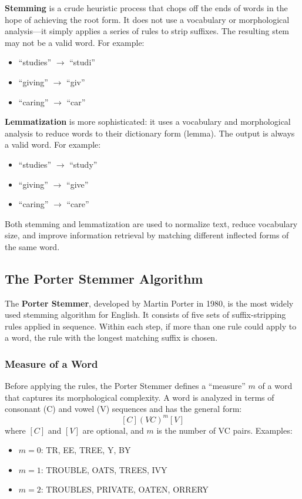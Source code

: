 \documentclass[11pt,a4paper]{article}
\begin{document}
\textbf{Stemming} is a crude heuristic process that chops off the ends of words in the hope of achieving the root form. It does not use a vocabulary or morphological analysis---it simply applies a series of rules to strip suffixes. The resulting stem may not be a valid word. For example:
\begin{itemize}
    \item ``studies'' $\to$ ``studi''
    \item ``giving'' $\to$ ``giv''
    \item ``caring'' $\to$ ``car''
\end{itemize}

\textbf{Lemmatization} is more sophisticated: it uses a vocabulary and morphological analysis to reduce words to their dictionary form (lemma). The output is always a valid word. For example:
\begin{itemize}
    \item ``studies'' $\to$ ``study''
    \item ``giving'' $\to$ ``give''
    \item ``caring'' $\to$ ``care''
\end{itemize}

Both stemming and lemmatization are used to normalize text, reduce vocabulary size, and improve information retrieval by matching different inflected forms of the same word.

\subsection{The Porter Stemmer Algorithm}

The \textbf{Porter Stemmer}, developed by Martin Porter in 1980, is the most widely used stemming algorithm for English. It consists of five sets of suffix-stripping rules applied in sequence. Within each step, if more than one rule could apply to a word, the rule with the longest matching suffix is chosen.

\subsubsection{Measure of a Word}

Before applying the rules, the Porter Stemmer defines a ``measure'' $m$ of a word that captures its morphological complexity. A word is analyzed in terms of consonant (C) and vowel (V) sequences and has the general form:
\[
[C](VC)^m[V]
\]
where $[C]$ and $[V]$ are optional, and $m$ is the number of VC pairs. Examples:
\begin{itemize}
    \item $m = 0$: TR, EE, TREE, Y, BY
    \item $m = 1$: TROUBLE, OATS, TREES, IVY
    \item $m = 2$: TROUBLES, PRIVATE, OATEN, ORRERY
\end{itemize}
\end{document}
